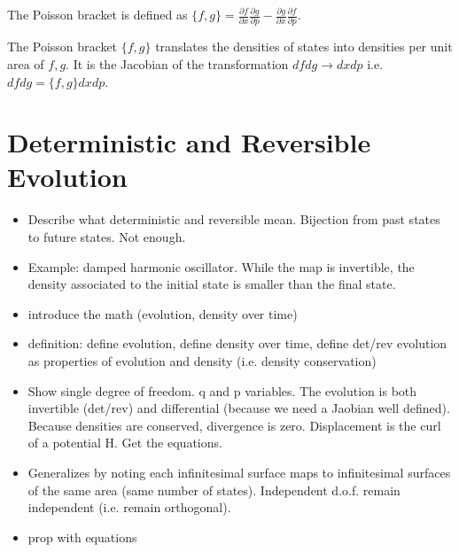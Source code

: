 \documentclass{article}
\begin{document}
\begin{defn}
	The Poisson bracket is defined as $\{f,g\} = \frac{\partial f}{\partial x}\frac{\partial g}{\partial p} - \frac{\partial g}{\partial x}\frac{\partial f}{\partial p}$.
\end{defn}

\begin{prop}
	The Poisson bracket $\{f, g\}$ translates the densities of states into densities per unit area of $f, g$. It is the Jacobian of the transformation $dfdg \rightarrow dxdp$ i.e. $dfdg = \{f,g\}dxdp$.
\end{prop}
	
\section{Deterministic and Reversible Evolution}

\begin{itemize}
	\item Describe what deterministic and reversible mean. Bijection from past states to future states. Not enough.
	
	\item Example: damped harmonic oscillator. While the map is invertible, the density associated to the initial state is smaller than the final state.
	
	\item introduce the math (evolution, density over time)
	
	\item definition: define evolution, define density over time, define det/rev evolution as properties of evolution and density (i.e. density conservation)
	
	\item Show single degree of freedom. q and p variables. The evolution is both invertible (det/rev) and differential (because we need a Jaobian well defined). Because densities are conserved, divergence is zero. Displacement is the curl of a potential H. Get the equations.
	
	\item Generalizes by noting each infinitesimal surface maps to infinitesimal surfaces of the same area (same number of states). Independent d.o.f. remain independent (i.e. remain orthogonal).
	
	\item prop with equations
	
\end{itemize}
\end{document}
